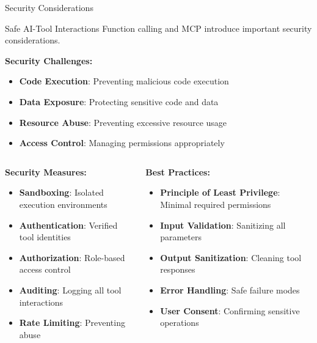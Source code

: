\documentclass{beamer}
\begin{document}
\begin{frame}[t]{Security Considerations}
    \begin{block}{Safe AI-Tool Interactions}
        Function calling and MCP introduce important security considerations.
    \end{block}
    
    \textbf{Security Challenges:}
    \begin{itemize}
        \item \textbf{Code Execution}: Preventing malicious code execution
        \item \textbf{Data Exposure}: Protecting sensitive code and data
        \item \textbf{Resource Abuse}: Preventing excessive resource usage
        \item \textbf{Access Control}: Managing permissions appropriately
    \end{itemize}
    
    \begin{columns}[t]
        \begin{column}{0.5\textwidth}
            \textbf{Security Measures:}
            \begin{itemize}
                \item \textbf{Sandboxing}: Isolated execution environments
                \item \textbf{Authentication}: Verified tool identities
                \item \textbf{Authorization}: Role-based access control
                \item \textbf{Auditing}: Logging all tool interactions
                \item \textbf{Rate Limiting}: Preventing abuse
            \end{itemize}
        \end{column}
        \begin{column}{0.5\textwidth}
            \textbf{Best Practices:}
            \begin{itemize}
                \item \textbf{Principle of Least Privilege}: Minimal required permissions
                \item \textbf{Input Validation}: Sanitizing all parameters
                \item \textbf{Output Sanitization}: Cleaning tool responses
                \item \textbf{Error Handling}: Safe failure modes
                \item \textbf{User Consent}: Confirming sensitive operations
            \end{itemize}
        \end{column}
    \end{columns}
\end{frame}
\end{document}
